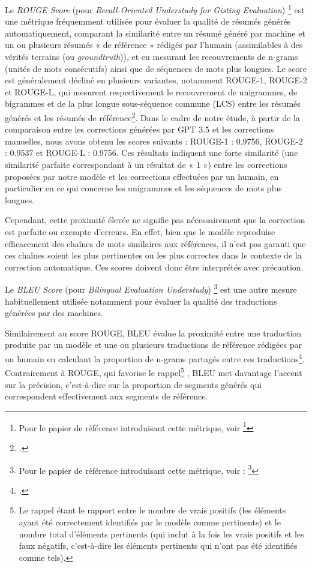 \newline
Le \textit{ROUGE Score} (pour \textit{Recall-Oriented Understudy for Gisting Evaluation}) \footnote{Pour le papier de référence introduisant cette métrique, voir \footcite{lin_rouge_2004}} est une métrique fréquemment utilisée pour évaluer la qualité de résumés générés automatiquement, comparant la similarité entre un résumé généré par machine et un ou plusieurs résumés « de référence » rédigés par l’humain (assimilables à des vérités terrains (ou \textit{groundtruth})), et en mesurant les recouvrements de n-grams (unités de mots consécutifs) ainsi que de séquences de mots plus longues. Le score est généralement décliné en plusieurs variantes, notamment ROUGE-1, ROUGE-2 et ROUGE-L, qui mesurent respectivement le recouvrement de unigrammes, de bigrammes et de la plus longue sous-séquence commune (LCS) entre les résumés générés et les résumés de référence\footcite{santhosh_understanding_2023}.
Dans le cadre de notre étude, à partir de la comparaison entre les corrections générées par GPT 3.5 et les corrections manuelles, nous avons obtenu les scores suivants : ROUGE-1 : 0.9756, ROUGE-2 : 0.9537 et ROUGE-L : 0.9756. Ces résultats indiquent une forte similarité (une similarité parfaite correspondant à un résultat de « 1 ») entre les corrections proposées par notre modèle et les corrections effectuées par un humain, en particulier en ce qui concerne les unigrammes et les séquences de mots plus longues. 

Cependant, cette proximité élevée ne signifie pas nécessairement que la correction est parfaite ou exempte d’erreurs. En effet, bien que le modèle reproduise efficacement des chaînes de mots similaires aux références, il n’est pas garanti que ces chaînes soient les plus pertinentes ou les plus correctes dans le contexte de la correction automatique. Ces scores doivent donc être interprétés avec précaution. 

\newline
Le \textit{BLEU Score} (pour \textit{Bilingual Evaluation Understudy}) \footnote{Pour le papier de référence introduisant cette métrique, voir : \footcite{papineni_bleu_2002}} est une autre mesure habituellement utilisée notamment pour évaluer la qualité des traductions générées par des machines. 

Similairement au score ROUGE, BLEU évalue la proximité entre une traduction produite par un modèle et une ou plusieurs traductions de référence rédigées par un humain en calculant la proportion de n-grams partagés entre ces traductions\footcite{santhosh_understanding_2023}. Contrairement à ROUGE, qui favorise le rappel\footnote{Le rappel étant le rapport entre le nombre de vrais positifs (les éléments ayant été correctement identifiés par le modèle comme pertinents) et le nombre total d'éléments pertinents (qui inclut à la fois les vrais positifs et les faux négatifs, c'est-à-dire les éléments pertinents qui n'ont pas été identifiés comme tels).}  , BLEU met davantage l'accent sur la précision, c'est-à-dire sur la proportion de segments générés qui correspondent effectivement aux segments de référence.

